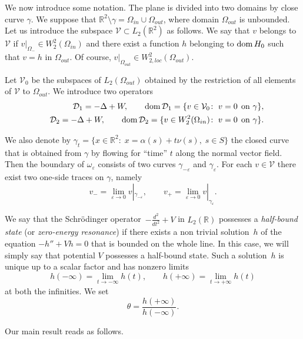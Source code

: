 \documentclass[graybox]{svmult}
\newcommand{\dom}{\mathop{\rm dom}}
\newcommand{\Real}{\mathbb R}
\newcommand{\eps}{\varepsilon}
\renewcommand{\emph}[1]{{\textit{#1}}}
\begin{document}
We now introduce some notation. The plane is divided into two domains by close curve $\gamma$.  We suppose that $\Real^2\setminus\gamma=\Omega_{in}\cup\Omega_{out}$, where domain $\Omega_{out}$ is unbounded. Let us introduce the subspace $\mathcal{V}\subset L_2(\Real^2)$ as follows.
We say that $v$ belongs to $\mathcal{V}$ if $v|_{\Omega_-}\in W_2^2(\Omega_{in})$ and there exist a function $h$ belonging to $\dom H_0$ such that $v=h$ in $\Omega_{out}$. Of course, $v|_{\Omega_{out}}\in W_{2, loc}^2(\Omega_{out})$.

Let $\mathcal{V}_0$ be the subspaces of $L_2(\Omega_{out})$
obtained by the restriction of all elements of $\mathcal{V}$ to $\Omega_{out}$.   We introduce two operators
\begin{eqnarray}\nonumber
&&\mathcal{D}_1= -\Delta+W, \qquad \dom \mathcal{D}_1=\{v\in \mathcal{V}_0\colon\; v=0 \;\,\mbox{on } \gamma\},\\\nonumber
&&\mathcal{D}_2= -\Delta+W, \qquad \dom \mathcal{D}_2=\{v\in W_2^2(\Omega_{in})\colon\; v=0 \;\,\mbox{on } \gamma\}.
\end{eqnarray}


We also denote by $\gamma_t=\{x\in\Real^2\colon\; x=\alpha(s)+t\nu(s), \; s\in S\}$ the closed curve that is obtained from $\gamma$ by flowing for ``time'' $t$ along the normal vector field. Then the boundary of $\omega_\eps$ consists of two curves $\gamma_{-\eps}$ and $\gamma_{\eps}$. For each $v\in \mathcal{V}$ there exist two one-side traces on $\gamma$, namely
$$
  v_-=\lim_{\eps\to 0}v|_{\gamma_{-\eps}}, \qquad
v_+=\lim_{\eps\to 0}v|_{\gamma_{\eps}}.
$$






We say that the Schr\"odinger operator~$-\frac{d^2}{d t^2}+V$ in $L_2(\Real)$ possesses a \emph{half-bound state} (or \emph{zero-energy resonance}) if there exists a non trivial solution~$h$ of the equation $-h'' +Vh= 0$ that is bounded on the whole line.  In this case, we will simply say that potential $V$ possesses a half-bound state.
Such a solution~$h$ is  unique up to a scalar factor and has nonzero limits
$$
  h(-\infty)=\lim\limits_{t\to-\infty}h(t), \qquad
  h(+\infty)=\lim\limits_{t\to+\infty}h(t)
$$
at both the infinities. We set
\begin{equation}\label{Theta}
  \theta=\frac{h(+\infty)}{h(-\infty)}.
\end{equation}



Our main result reads as follows.
\end{document}

